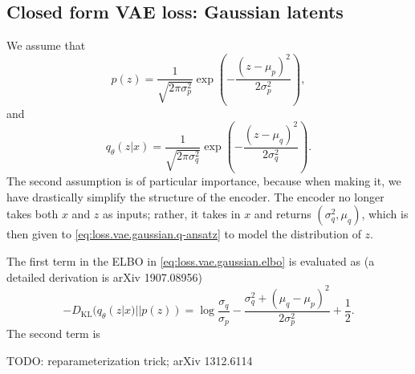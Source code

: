 \documentclass[hyperref, a4paper, 12pt]{report}
\begin{document}
\subsection{Closed form VAE loss: Gaussian latents}

We assume that 
\begin{equation}
    p(z) = \frac{1}{\sqrt{2\pi \sigma_p^2}} \exp(- \frac{(z - \mu_p)^2}{2 \sigma_p^2}),
\end{equation} 
and 
\begin{equation}
    q_\theta(z | x) = \frac{1}{\sqrt{2\pi \sigma_q^2}} \exp(- \frac{(z - \mu_q)^2}{2 \sigma_q^2}).
    \label{eq:loss.vae.gaussian.q-ansatz}
\end{equation}
The second assumption is of particular importance,
because when making it, we have drastically simplify the structure of the encoder.
The encoder no longer takes both $x$ and $z$ as inputs;
rather, it takes in $x$ and returns $(\sigma_q^2, \mu_q)$,
which is then given to \eqref{eq:loss.vae.gaussian.q-ansatz} to model the distribution of $z$.

The first term in the ELBO in \eqref{eq:loss.vae.gaussian.elbo} is evaluated as (a detailed derivation is arXiv 1907.08956)
\begin{equation}
    - D_{\text{KL}}(q_\theta(z|x) || p(z)) = \log \frac{\sigma_q}{\sigma_p} - \frac{\sigma_q^2 + (\mu_q - \mu_p)^2}{2 \sigma_p^2} + \frac{1}{2}.
\end{equation}
The second term is 

TODO: reparameterization trick; arXiv 1312.6114
\end{document}
